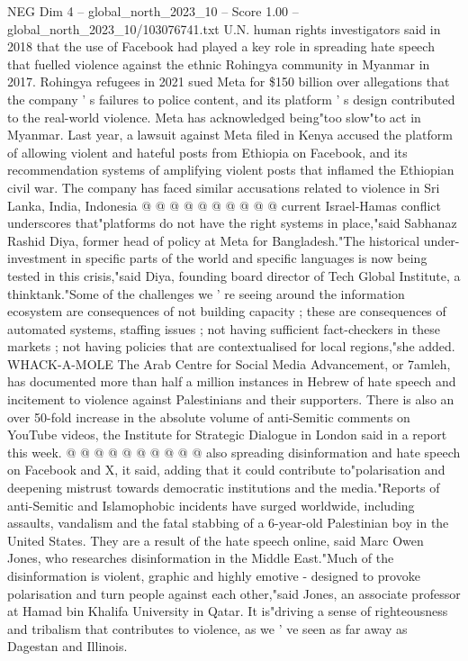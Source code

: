 \begin{textsample}{NEG Dim 4 – global\_north\_2023\_10 – Score 1.00 – global\_north\_2023\_10/103076741.txt}
U.N. human rights investigators said in 2018 that the use of Facebook had played a key role in spreading hate speech that fuelled violence against the ethnic Rohingya community in Myanmar in 2017.
Rohingya refugees in 2021 sued Meta for \$150 billion over allegations that the company ' s failures to police content, and its platform ' s design contributed to the real-world violence.
Meta has acknowledged being"too slow"to act in Myanmar.
Last year, a lawsuit against Meta filed in Kenya accused the platform of allowing violent and hateful posts from Ethiopia on Facebook, and its recommendation systems of amplifying violent posts that inflamed the Ethiopian civil war.
The company has faced similar accusations related to violence in Sri Lanka, India, Indonesia @ @ @ @ @ @ @ @ @ @ current Israel-Hamas conflict underscores that"platforms do not have the right systems in place,"said Sabhanaz Rashid Diya, former head of policy at Meta for Bangladesh."The historical under-investment in specific parts of the world and specific languages is now being tested in this crisis,"said Diya, founding board director of Tech Global Institute, a thinktank."Some of the challenges we ' re seeing around the information ecosystem are consequences of not building capacity ; these are consequences of automated systems, staffing issues ; not having sufficient fact-checkers in these markets ; not having policies that are contextualised for local regions,"she added.
WHACK-A-MOLE The Arab Centre for Social Media Advancement, or 7amleh, has documented more than half a million instances in Hebrew of hate speech and incitement to violence against Palestinians and their supporters.
There is also an over 50-fold increase in the absolute volume of anti-Semitic comments on YouTube videos, the Institute for Strategic Dialogue in London said in a report this week. @ @ @ @ @ @ @ @ @ @ also spreading disinformation and hate speech on Facebook and X, it said, adding that it could contribute to"polarisation and deepening mistrust towards democratic institutions and the media."Reports of anti-Semitic and Islamophobic incidents have surged worldwide, including assaults, vandalism and the fatal stabbing of a 6-year-old Palestinian boy in the United States.
They are a result of the hate speech online, said Marc Owen Jones, who researches disinformation in the Middle East."Much of the disinformation is violent, graphic and highly emotive - designed to provoke polarisation and turn people against each other,"said Jones, an associate professor at Hamad bin Khalifa University in Qatar.
It is"driving a sense of righteousness and tribalism that contributes to violence, as we ' ve seen as far away as Dagestan and Illinois.

\end{textsample}
